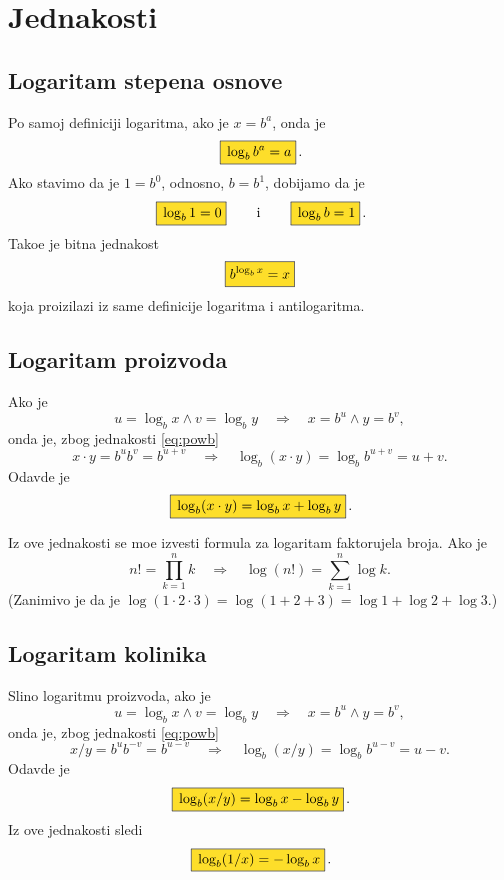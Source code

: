 \documentclass[12pt, twoside, a4paper]{article}
\def\logb{\log_b}
\def\okvir#1{\,\fcolorbox{black}{Goldenrod}{$\displaystyle{\mathstrut #1}$}\,}
\def\sledi{{\quad\Rightarrow\quad}}
\begin{document}
\section{Jednakosti}

\subsection{Logaritam stepena osnove}

Po samoj definiciji logaritma, ako je $x=b^a$, onda je
\begin{equation}
\okvir{\logb b^a=a}.
\label{eq:powb}
\end{equation}
Ako stavimo da je $1=b^0$, odnosno, $b=b^1$, dobijamo da je
\begin{equation}
\okvir{\logb 1=0}\qquad\text{i}\qquad\okvir{\logb b=1}.
\end{equation}
Tako{\dj}e je bitna jednakost
\begin{equation}
\okvir{b^{\logb x}=x}
\end{equation}
koja proizilazi iz same definicije logaritma i antilogaritma.

\subsection{Logaritam proizvoda}

Ako je
$$
u=\logb x\land v=\log_b y \sledi x=b^u\land y=b^v,
$$
onda je, zbog jednakosti \eqref{eq:powb}
$$
x\cdot y=b^ub^v=b^{u+v}\sledi \logb(x\cdot y)=\logb b^{u+v}=u+v.
$$
Odavde je
\begin{equation}
\okvir{\logb(x\cdot y)=\logb x+\logb y}.
\label{eq:lnmul}
\end{equation}

Iz ove jednakosti se mo{\zv}e izvesti formula za logaritam faktorujela broja. Ako je
$$
n!=\prod_{k=1}^n k\sledi \log(n!)=\sum_{k=1}^n\log k.
$$
(Zanim{\lj}ivo je da je $\log(1\cdot2\cdot3)=\log(1+2+3)=\log1+\log2+\log3$.)


\subsection{Logaritam koli{\cv}nika}

Sli{\cv}no logaritmu proizvoda, 
ako je
$$
u=\logb x\land v=\log_b y \sledi x=b^u\land y=b^v,
$$
onda je, zbog jednakosti \eqref{eq:powb}
$$
x/ y=b^ub^{-v}=b^{u-v}\sledi \logb(x/y)=\logb b^{u-v}=u-v.
$$
Odavde je
\begin{equation}
\okvir{\logb(x/ y)=\logb x-\logb y}.
\label{eq:lndiv}
\end{equation}
Iz ove jednakosti sledi
\begin{equation}
\okvir{\logb(1/x)=-\logb x}.
\label{eq:recip}
\end{equation}
\end{document}
